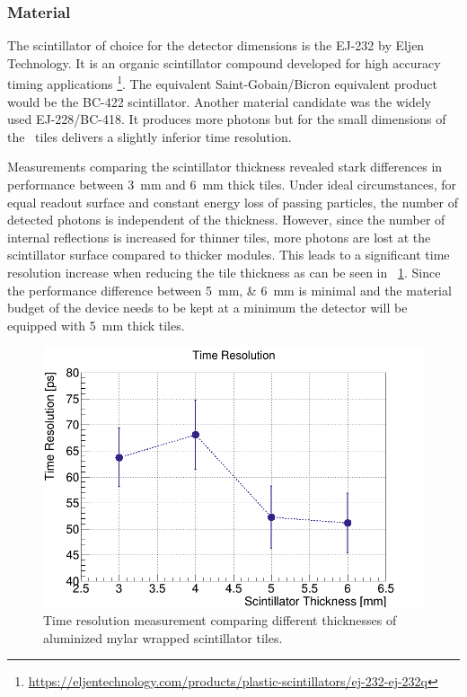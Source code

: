 \documentclass[../BTOF_summary.tex]{subfiles}
\begin{document}
\subsubsection*{Material}
The scintillator of choice for the detector dimensions is the EJ-232 by Eljen Technology. It is an organic scintillator compound developed for high accuracy timing applications \footnote{\url{https://eljentechnology.com/products/plastic-scintillators/ej-232-ej-232q}}.
The equivalent Saint-Gobain/Bicron equivalent product would be the BC-422 scintillator.
Another material candidate was the widely used EJ-228/BC-418.
It produces more photons but for the small dimensions of the \btof\ tiles delivers a slightly inferior time resolution.

Measurements comparing the scintillator thickness revealed stark differences in performance between \SI{3}{mm} and \SI{6}{mm} thick tiles. 
Under ideal circumstances, for equal readout surface and constant energy loss of passing particles, the number of detected photons is independent of the thickness.
However, since the number of internal reflections is increased for thinner tiles, more photons are lost at the scintillator surface compared to thicker modules.
This leads to a significant time resolution increase when reducing the tile thickness as can be seen in \fig ~\ref{fig:Tchickness_timeRes}.
Since the performance difference between \SIlist[]{5;6}{mm} is minimal and the material budget of the device needs to be kept at a minimum the detector will be equipped with \SI{5}{mm} thick tiles.

\begin{figure}[htbp]
	\centering
	\includegraphics[width=.7\textwidth]{fig/TimeResSummary.png}
	\caption{Time resolution measurement comparing different thicknesses of aluminized mylar wrapped scintillator tiles.}
	\label{fig:Tchickness_timeRes}
\end{figure}
\end{document}
